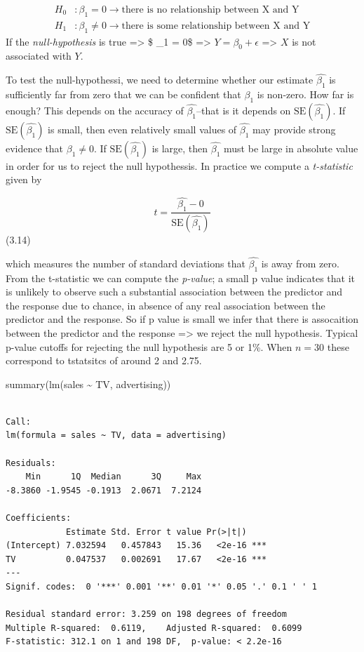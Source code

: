 \documentclass[
  letterpaper,
  DIV=11,
  numbers=noendperiod]{scrreprt}
\newenvironment{Shaded}{\begin{snugshade}}{\end{snugshade}}
\newcommand{\FunctionTok}[1]{\textcolor[rgb]{0.02,0.16,0.49}{#1}}
\newcommand{\NormalTok}[1]{\textcolor[rgb]{0.33,0.33,0.33}{#1}}
\newcommand{\SpecialCharTok}[1]{\textcolor[rgb]{0.00,0.46,0.62}{#1}}
\begin{document}
\[
\begin{align}
H_0 &: \beta_1 = 0 \to \text{there is no relationship between X and Y} \\
H_1 &: \beta_1 \neq 0 \to \text{there is some relationship between X and Y}
\end{align}
\] If the \emph{null-hypothesis} is true =\textgreater{} \$ \beta\_1 =
0\$ =\textgreater{} \(Y = \beta_0 + \epsilon\) =\textgreater{} \(X\) is
not associated with \(Y\).

To test the null-hypothessi, we need to determine whether our estimate
\(\hat{\beta_1}\) is sufficiently far from zero that we can be confident
that \(\beta_1\) is non-zero. How far is enough? This depends on the
accuracy of \(\hat{\beta_1}\)--that is it depends on
\(\text{SE}(\hat{\beta_1})\). If \(\text{SE}(\hat{\beta_1})\) is small,
then even relatively small values of \(\hat{\beta_1}\) may provide
strong evidence that \(\beta_1 \neq 0\). If \(\text{SE}(\hat{\beta_1})\)
is large, then \(\hat{\beta_1}\) must be large in absolute value in
order for us to reject the null hypothessis. In practice we compute a
\emph{t-statistic} given by

\[
t = \frac{\hat{\beta_1} - 0}{\text{SE}(\hat{\beta_1})}
\] (3.14)

which measures the number of standard deviations that \(\hat{\beta_1}\)
is away from zero. From the t-statistic we can compute the
\emph{p-value}; a small p value indicates that it is unlikely to observe
such a substantial association between the predictor and the response
due to chance, in absence of any real association between the predictor
and the response. So if p value is small we infer that there is
assocaition between the predictor and the response =\textgreater{} we
reject the null hypothesis. Typical p-value cutoffs for rejecting the
null hypothesis are 5 or 1\%. When \(n=30\) these correspond to
tstatsitcs of around 2 and 2.75.

\begin{Shaded}
\begin{Highlighting}[]
\FunctionTok{summary}\NormalTok{(}\FunctionTok{lm}\NormalTok{(sales }\SpecialCharTok{\textasciitilde{}}\NormalTok{ TV, advertising))}
\end{Highlighting}
\end{Shaded}

\begin{verbatim}

Call:
lm(formula = sales ~ TV, data = advertising)

Residuals:
    Min      1Q  Median      3Q     Max 
-8.3860 -1.9545 -0.1913  2.0671  7.2124 

Coefficients:
            Estimate Std. Error t value Pr(>|t|)    
(Intercept) 7.032594   0.457843   15.36   <2e-16 ***
TV          0.047537   0.002691   17.67   <2e-16 ***
---
Signif. codes:  0 '***' 0.001 '**' 0.01 '*' 0.05 '.' 0.1 ' ' 1

Residual standard error: 3.259 on 198 degrees of freedom
Multiple R-squared:  0.6119,    Adjusted R-squared:  0.6099 
F-statistic: 312.1 on 1 and 198 DF,  p-value: < 2.2e-16
\end{verbatim}
\end{document}
